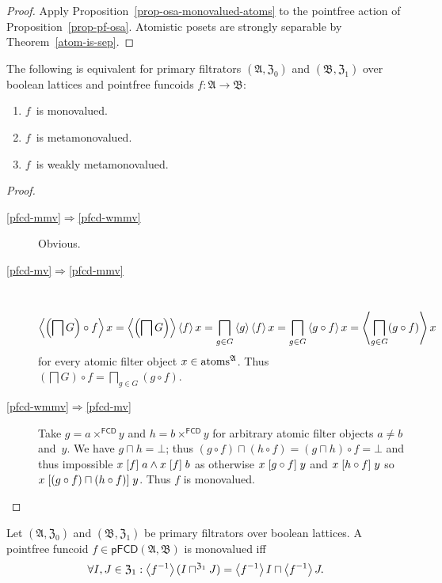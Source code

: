 \begin{proof}
Apply Proposition~\ref{prop-osa-monovalued-atoms} to the
pointfree action of Proposition~\ref{prop-pf-osa}. Atomistic
posets are strongly separable by Theorem~\ref{atom-is-sep}.
\end{proof}
\begin{thm}
The following is equivalent for primary filtrators $(\mathfrak{A},\mathfrak{Z}_{0})$
and $(\mathfrak{B},\mathfrak{Z}_{1})$ over boolean lattices and pointfree
funcoids $f:\mathfrak{A}\rightarrow\mathfrak{B}$:
\begin{enumerate}
\item \label{pfcd-mv}$f$~is monovalued.
\item \label{pfcd-mmv}$f$~is metamonovalued.
\item \label{pfcd-wmmv}$f$~is weakly metamonovalued.
\end{enumerate}
\end{thm}
\begin{proof}
~
\begin{description}
\item [{\ref{pfcd-mmv}$\Rightarrow$\ref{pfcd-wmmv}}] Obvious.
\item [{\ref{pfcd-mv}$\Rightarrow$\ref{pfcd-mmv}}] ~
\[
\left\langle \left(\bigsqcap G\right)\circ f\right\rangle x=\left\langle \left(\bigsqcap G\right)\right\rangle\left\langle f\right\rangle x=\bigsqcap_{g\in G}\left\langle g\right\rangle\left\langle f\right\rangle x=\bigsqcap_{g\in G}\left\langle g\circ f\right\rangle x=\left\langle \bigsqcap_{g\in G}(g\circ f)\right\rangle x
\]
for every atomic filter object $x\in\operatorname{atoms}^{\mathfrak{A}}$. Thus
$\left(\bigsqcap G\right)\circ f=\bigsqcap_{g\in G}(g\circ f)$.
\item [{\ref{pfcd-wmmv}$\Rightarrow$\ref{pfcd-mv}}] Take $g=a\times^{\mathsf{FCD}}y$
and $h=b\times^{\mathsf{FCD}}y$ for arbitrary atomic filter objects
$a\ne b$ and~$y$. We have $g\sqcap h=\bot$; thus $(g\circ f)\sqcap(h\circ f)=(g\sqcap h)\circ f=\bot$
and thus impossible $x\mathrel{\left[f\right]}a\land x\mathrel{\left[f\right]}b$ as otherwise $x\mathrel{\left[g\circ f\right]}y$
and $x\mathrel{\left[h\circ f\right]}y$ so $x\mathrel{\left[(g\circ f)\sqcap(h\circ f)\right]}y$.
Thus $f$ is monovalued.
\end{description}
\end{proof}
\begin{thm}
Let $(\mathfrak{A},\mathfrak{Z}_{0})$ and $(\mathfrak{B},\mathfrak{Z}_{1})$
be primary filtrators over boolean lattices. A pointfree funcoid
$f\in\mathsf{pFCD}(\mathfrak{A},\mathfrak{B})$ is monovalued iff
\[
\forall I,J\in\mathfrak{Z}_{1}:\left\langle f^{-1}\right\rangle(I\sqcap^{\mathfrak{Z}_{1}}J)=\left\langle f^{-1}\right\rangle I\sqcap\left\langle f^{-1}\right\rangle J.
\]
\end{thm}
